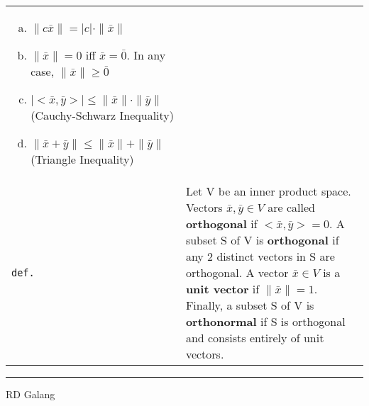 \documentclass[10pt,landscape]{article}
\begin{document}
\begin{multicols}{3}
\begin{tabular}{@{}p{\the\MyLen}%
                @{}p{\linewidth-\the\MyLen}@{}}
               \begin{enumerate}[a)]
                 \item $\| c\bar x\| = |c|\cdot \|\bar x\|$
                 \item $\| \bar x\| = 0$ iff $\bar x = \bar 0$. In any case, $\| \bar x\|\geq\bar 0$
                 \item $|<\bar x,\bar y>|\leq\|\bar x\|\cdot\|\bar y\|$ (Cauchy-Schwarz Inequality)
                 \item $\|\bar x + \bar y\|\leq\|\bar x\| + \|\bar y\|$ (Triangle Inequality)
               \end{enumerate}\\
\verb!def.! & Let V be an inner product space. Vectors $\bar x,\bar y\in V$ are called \textbf{orthogonal} if $<\bar x,\bar y> = 0$. A subset S of V is \textbf{orthogonal} if any 2
             distinct vectors in S are orthogonal. A vector $\bar x\in V$ is a \textbf{unit vector} if $\|\bar x\| = 1$. Finally, a subset S of V is \textbf{orthonormal} if S is
             orthogonal and consists entirely of unit vectors.
\end{tabular}

\rule{0.3\linewidth}{0.25pt}
\scriptsize

RD Galang

\end{multicols}
\end{document}
